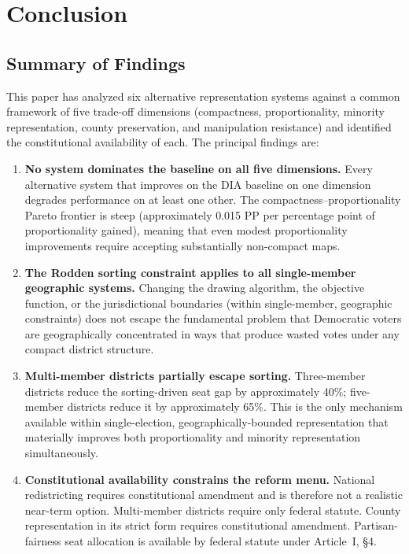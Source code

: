 \section{Conclusion}
\label{sec:conclusion}

\subsection{Summary of Findings}

This paper has analyzed six alternative representation systems against a common
framework of five trade-off dimensions (compactness, proportionality, minority
representation, county preservation, and manipulation resistance) and identified
the constitutional availability of each.  The principal findings are:

\begin{enumerate}
  \item \textbf{No system dominates the baseline on all five dimensions.}
        Every alternative system that improves on the DIA baseline on one
        dimension degrades performance on at least one other.  The
        compactness--proportionality Pareto frontier is steep (approximately
        0.015 PP per percentage point of proportionality gained), meaning that
        even modest proportionality improvements require accepting substantially
        non-compact maps.

  \item \textbf{The Rodden sorting constraint applies to all single-member
        geographic systems.}  Changing the drawing algorithm, the objective
        function, or the jurisdictional boundaries (within single-member,
        geographic constraints) does not escape the fundamental problem that
        Democratic voters are geographically concentrated in ways that produce
        wasted votes under any compact district structure.

  \item \textbf{Multi-member districts partially escape sorting.}
        Three-member districts reduce the sorting-driven seat gap by
        approximately 40\%; five-member districts reduce it by approximately
        65\%.  This is the only mechanism available within single-election,
        geographically-bounded representation that materially improves both
        proportionality and minority representation simultaneously.

  \item \textbf{Constitutional availability constrains the reform menu.}
        National redistricting requires constitutional amendment and is
        therefore not a realistic near-term option.  Multi-member districts
        require only federal statute.  County representation in its strict
        form requires constitutional amendment.  Partisan-fairness seat
        allocation is available by federal statute under Article~I, \S4.

\end{enumerate}

